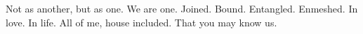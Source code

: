 

Not as another, but as one.  We are one.  Joined.  Bound.  Entangled.
Enmeshed.  In love.  In life.  All of me, house included.  That you
may know us.

\bye
